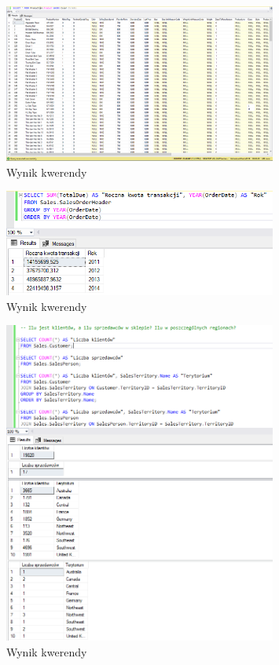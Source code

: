 \documentclass[a4paper,12pt]{article}
\begin{document}
\begin{figure}[H]
    \centering
    \includegraphics[width=0.8\textwidth]{images/02.png}
    \caption{Wynik kwerendy}
    \end{figure}

\begin{figure}[H]
    \centering
    \includegraphics[width=0.8\textwidth]{images/03.png}
    \caption{Wynik kwerendy}
    \end{figure}

\begin{figure}[H]
    \centering
    \includegraphics[width=0.8\textwidth]{images/04.png}
    \caption{Wynik kwerendy}
    \end{figure}
\end{document}

